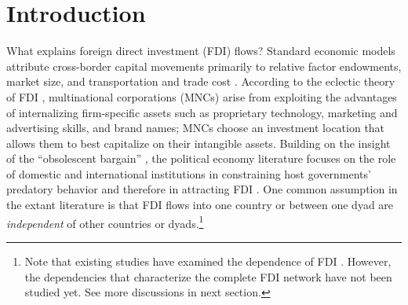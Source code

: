 \documentclass[reqno,onecolumn,letterpaper,12pt]{article}
\begin{document}

\sloppy
\clearpage
\doublespacing
\setcounter{page}{1}
\section{Introduction}


What explains foreign direct investment (FDI) flows? Standard economic models attribute cross-border capital movements primarily to relative factor endowments, market size, and transportation and trade cost \citep{Helpman:1984,Carr_et_al:2001}.
According to the eclectic theory of FDI \citep{Dunning:1988,Dunning:1992}, multinational corporations (MNCs) arise from exploiting the advantages of internalizing firm-specific assets such as proprietary technology, marketing and advertising skills, and brand names; MNCs choose an investment location that allows them to best capitalize on their intangible assets. Building on the insight of the ``obsolescent bargain'' \citep{Vernon:1971,Vernon:1980}, the political economy literature focuses on the role of domestic and international institutions in constraining host governments' predatory behavior and therefore in attracting FDI \citep[e.g.,][]{Jensen:2003,Jensen:2006,Li_Resnick:2003,Staats_Biglaiser:2012,Buthe_Milner:2008,Allee_Peinhardt:2011,Kerner:2009}. One common assumption in the extant literature is that FDI flows into one country or between one dyad are \emph{independent} of other countries or dyads.\footnote{Note that existing studies have examined the dependence of FDI \citep[e.g.,][]{coughlin2000foreign,blanco2012spatial,blonigen2007fdi,Baltagi_et_al:2007}. However, the dependencies that characterize the complete FDI network have not been studied yet. See more discussions in next section. }
\end{document}
